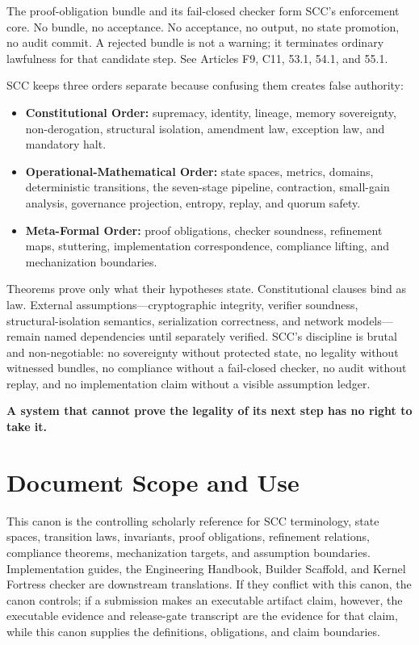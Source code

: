\documentclass[10pt,oneside]{article}
\theoremstyle{definition}
\theoremstyle{remark}
\begin{document}
The proof-obligation bundle and its fail-closed checker form SCC's enforcement core. No bundle, no acceptance. No acceptance, no output, no state promotion, no audit commit. A rejected bundle is not a warning; it terminates ordinary lawfulness for that candidate step. See Articles F9, C11, 53.1, 54.1, and 55.1.

SCC keeps three orders separate because confusing them creates false authority:
\begin{itemize}
  \item \textbf{Constitutional Order:} supremacy, identity, lineage, memory sovereignty, non-derogation, structural isolation, amendment law, exception law, and mandatory halt.
  \item \textbf{Operational-Mathematical Order:} state spaces, metrics, domains, deterministic transitions, the seven-stage pipeline, contraction, small-gain analysis, governance projection, entropy, replay, and quorum safety.
  \item \textbf{Meta-Formal Order:} proof obligations, checker soundness, refinement maps, stuttering, implementation correspondence, compliance lifting, and mechanization boundaries.
\end{itemize}

Theorems prove only what their hypotheses state. Constitutional clauses bind as law. External assumptions---cryptographic integrity, verifier soundness, structural-isolation semantics, serialization correctness, and network models---remain named dependencies until separately verified. SCC's discipline is brutal and non-negotiable: no sovereignty without protected state, no legality without witnessed bundles, no compliance without a fail-closed checker, no audit without replay, and no implementation claim without a visible assumption ledger.

\begin{center}\textbf{A system that cannot prove the legality of its next step has no right to take it.}\end{center}

\section{Document Scope and Use}
This canon is the controlling scholarly reference for SCC terminology, state spaces, transition laws, invariants, proof obligations, refinement relations, compliance theorems, mechanization targets, and assumption boundaries. Implementation guides, the Engineering Handbook, Builder Scaffold, and Kernel Fortress checker are downstream translations. If they conflict with this canon, the canon controls; if a submission makes an executable artifact claim, however, the executable evidence and release-gate transcript are the evidence for that claim, while this canon supplies the definitions, obligations, and claim boundaries.
\end{document}
